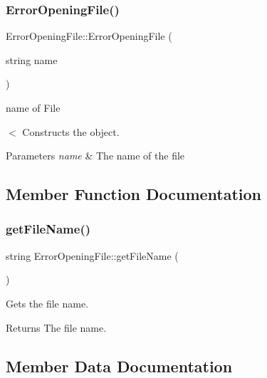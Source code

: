 \subsubsection{\texorpdfstring{Error\+Opening\+File()}{ErrorOpeningFile()}}
{\footnotesize\ttfamily Error\+Opening\+File\+::\+Error\+Opening\+File (\begin{DoxyParamCaption}\item[{string}]{name }\end{DoxyParamCaption})\hspace{0.3cm}{\ttfamily [inline]}}



name of File 

$<$ Constructs the object.


\begin{DoxyParams}{Parameters}
{\em name} & The name of the file \\
\hline
\end{DoxyParams}


\subsection{Member Function Documentation}
\mbox{\label{classErrorOpeningFile_a6177800f93b1e928ead4f55ef3421120}} 
\subsubsection{\texorpdfstring{get\+File\+Name()}{getFileName()}}
{\footnotesize\ttfamily string Error\+Opening\+File\+::get\+File\+Name (\begin{DoxyParamCaption}{ }\end{DoxyParamCaption})\hspace{0.3cm}{\ttfamily [inline]}}



Gets the file name. 

\begin{DoxyReturn}{Returns}
The file name. 
\end{DoxyReturn}


\subsection{Member Data Documentation}
\mbox{\label{classErrorOpeningFile_a24d6690f6660667ef0532b68e3ee7ea9}} 

